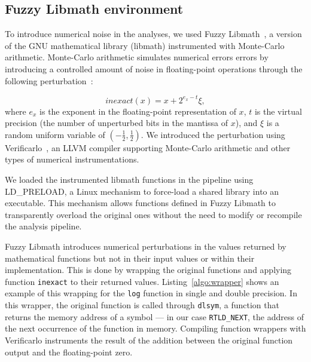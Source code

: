 \documentclass[11pt,onecolumn]{article}
\begin{document}
\subsection{Fuzzy Libmath environment}

To introduce numerical noise in the analyses, we used
Fuzzy Libmath~\cite{salari2021accurate}, a version of the GNU
mathematical library (libmath) instrumented with Monte-Carlo arithmetic.
Monte-Carlo arithmetic simulates numerical errors
errors by introducing a controlled amount of noise in floating-point
operations through the following perturbation~\cite{Parker1997-qq}:

\begin{equation} \label{eq:mca_inexact}
  inexact(x) = x + 2^{e_x-t}\xi,
\end{equation}
where $e_x$ is the exponent in the floating-point representation of $x$,
$t$ is the virtual precision (the number of unperturbed bits in the
mantissa of $x$), and $\xi$ is a random uniform variable of
$(-\frac{1}{2}, \frac{1}{2})$. We introduced the perturbation using 
Verificarlo~\cite{denis2015verificarlo}, an LLVM compiler supporting Monte-Carlo 
arithmetic and other types of numerical instrumentations.

We loaded the instrumented libmath functions in the pipeline using
LD\_PRELOAD, a Linux mechanism to force-load a shared library into an
executable. This mechanism allows functions defined in Fuzzy Libmath to transparently
overload the original ones without the need to modify or recompile the
analysis pipeline.

Fuzzy Libmath introduces numerical perturbations in the values returned by
mathematical functions but not in their input values or within their
implementation. This is done by wrapping the original functions and
applying function \texttt{inexact} to their returned values.
Listing~\ref{algo:wrapper} shows an example of this wrapping for the
\texttt{log} function in single and double precision. In this wrapper, the
original function is called through \texttt{dlsym}, a function that returns
the memory address of a symbol --- in our case \texttt{RTLD\_NEXT}, the
address of the next occurrence of the function in memory. Compiling function wrappers
with Verificarlo instruments the result of the
addition between the original function output and the floating-point zero.


\end{document}
